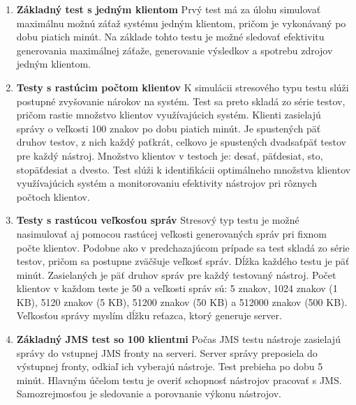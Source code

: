 \documentclass[12pt,oneside,final]{fithesis-utf8}
\begin{document}
\begin{enumerate}

\item \textbf{Základný test s jedným klientom}
\newline
Prvý test má za úlohu simulovať maximálnu možnú záťaž systému jedným klientom, pričom je vykonávaný po dobu piatich minút. Na základe tohto testu je možné sledovať efektivitu generovania maximálnej záťaže, generovanie výsledkov a spotrebu zdrojov jedným klientom.
\newline

\item \textbf{Testy s rastúcim počtom klientov}
\newline
K simulácii stresového typu testu slúži postupné zvyšovanie nárokov na systém. Test sa preto skladá zo série testov, pričom rastie množstvo klientov využívajúcich systém. Klienti zasielajú správy o veľkosti 100 znakov po dobu piatich minút. Je spustených päť druhov testov, z nich každý paťkrát, celkovo je spustených dvadsaťpäť testov pre každý nástroj. Množstvo klientov v testoch je: desať, päťdesiat, sto, stopäťdesiat a dvesto. Test slúži k identifikácii optimálneho množstva klientov využívajúcich systém a monitorovaniu efektivity nástrojov pri rôznych počtoch klientov.
\newline

\item \textbf{Testy s rastúcou veľkosťou správ}
\newline
Stresový typ testu je možné nasimulovať aj pomocou rastúcej veľkosti generovaných správ pri fixnom počte klientov. Podobne ako v predchazajúcom prípade sa test skladá zo série testov, pričom sa postupne zväčšuje veľkosť správ. Dĺžka každého testu je päť minút. Zasielaných je päť druhov správ pre každý testovaný nástroj. Počet klientov v každom teste je 50 a veľkosti  správ sú: 5 znakov, 1024 znakov (1 KB), 5120 znakov (5 KB), 51200 znakov (50 KB) a 512000 znakov (500 KB). Veľkosťou správy myslím dĺžku reťazca, ktorý generuje server.
\newline

\newpage
\item \textbf{Základný JMS test so 100 klientmi}
\newline
Počas JMS testu nástroje zasielajú správy do vstupnej JMS fronty na serveri. Server správy preposiela do výstupnej fronty, odkiaľ ich vyberajú nástroje. Test prebieha po dobu 5 minút. Hlavným účelom testu je overiť schopnosť nástrojov pracovať s JMS. Samozrejmosťou je sledovanie a porovnanie výkonu nástrojov.
\newline


\end{enumerate}
\end{document}
